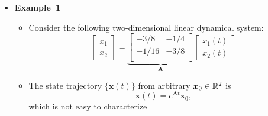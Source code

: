 \documentclass[12pt,a4paper]{article}
\begin{document}
\begin{itemize}

\item \textbf{Example~1}
  \begin{itemize}
  \item Consider the following two-dimensional linear dynamical system:
    \begin{equation}\nonumber%
      \begin{bmatrix}
        \dot{x}_{1} \\
        \dot{x}_{2}
      \end{bmatrix}
      =
      \underbrace{
      \begin{bmatrix}
        -3/8 & -1/4 \\
        -1/16 & -3/8 \\
      \end{bmatrix}%
      }_{\bm{A}}
      \begin{bmatrix}
        x_{1}(t) \\
        x_{2}(t)
      \end{bmatrix}
    \end{equation}
    \item The state trajectory $\{\bm{x}(t)\}$ from arbitrary $\bm{x}_{0}\in \mathbb{R}^{2}$ is
      \begin{equation}\nonumber%
        \bm{x}(t)
        =
        e^{\bm{A}t}\bm{x}_{0},
    \end{equation}
    which is not easy to characterize


\end{itemize}
\end{itemize}
\end{document}
